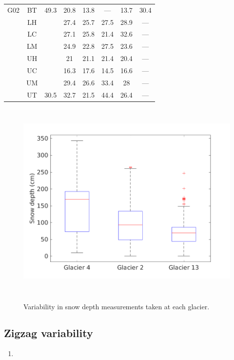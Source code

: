 \documentclass[12pt]{article}
\begin{document}
\begin{table}[]
\begin{tabular}{cccccccc}
\multirow{-8}{*}{G02} & BT & \multirow{-8}{*}{49.3} & 20.8 & 13.8 & --- & 13.7 & 30.4 \\
\rowcolor[HTML]{EFEFEF} 
\cellcolor[HTML]{EFEFEF} & LH & \cellcolor[HTML]{EFEFEF} & 27.4 & 25.7 & 27.5 & 28.9 & --- \\
\rowcolor[HTML]{EFEFEF} 
\cellcolor[HTML]{EFEFEF} & LC & \cellcolor[HTML]{EFEFEF} & 27.1 & 25.8 & 21.4 & 32.6 & --- \\
\rowcolor[HTML]{EFEFEF} 
\cellcolor[HTML]{EFEFEF} & LM & \cellcolor[HTML]{EFEFEF} & 24.9 & 22.8 & 27.5 & 23.6 & --- \\
\rowcolor[HTML]{EFEFEF} 
\cellcolor[HTML]{EFEFEF} & UH & \cellcolor[HTML]{EFEFEF} & 21 & 21.1 & 21.4 & 20.4 & --- \\
\rowcolor[HTML]{EFEFEF} 
\cellcolor[HTML]{EFEFEF} & UC & \cellcolor[HTML]{EFEFEF} & 16.3 & 17.6 & 14.5 & 16.6 & --- \\
\rowcolor[HTML]{EFEFEF} 
\cellcolor[HTML]{EFEFEF} & UM & \cellcolor[HTML]{EFEFEF} & 29.4 & 26.6 & 33.4 & 28 & --- \\
\rowcolor[HTML]{EFEFEF} 
\multirow{-7}{*}{\cellcolor[HTML]{EFEFEF}G13} & UT & \multirow{-7}{*}{\cellcolor[HTML]{EFEFEF}30.5} & 32.7 & 21.5 & 44.4 & 26.4 & ---
\end{tabular}
\end{table}

\begin{figure}[h]
	\centering
	\includegraphics[height = 10cm]{box_depth.png}\\
	\caption{Variability in snow depth measurements taken at each glacier.}
	\label{fig:box_depth}
\end{figure}


\subsection{Zigzag variability}











\begin{enumerate}
\item 
\end{enumerate}
\end{document}
